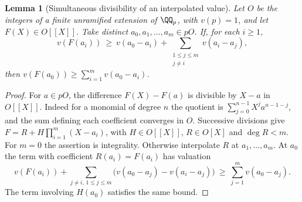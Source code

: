 \documentclass[a4paper,11pt]{article}
\newtheorem{lemma}[proposition]{Lemma}
\theoremstyle{definition}
\theoremstyle{remark}
\numberwithin{equation}{section}
\begin{document}
\begin{lemma}[Simultaneous divisibility of an interpolated value]
\label{lem:samples230}
Let \(O\) be the integers of a finite unramified extension of
\(\QQ_p\), with \(v(p)=1\), and let \(F(X)\in O[[X]]\).
Take distinct \(a_0,a_1,\ldots,a_m\in pO\). If, for each \(i\ge1\),
\[
 v(F(a_i))\ \ge\ v(a_0-a_i)+
                 \sum_{\substack{1\le j\le m\\j\ne i}}v(a_i-a_j),
\]
then \(v(F(a_0))\ge\sum_{i=1}^m v(a_0-a_i)\).
\end{lemma}
\begin{proof}
For \(a\in pO\), the difference \(F(X)-F(a)\) is divisible
by \(X-a\) in \(O[[X]]\). Indeed for a monomial of degree \(n\)
the quotient is \(\sum_{j=0}^{n-1}X^ja^{n-1-j}\), and the
sum defining each coefficient converges in \(O\). Successive
divisions give \(F=R+H\prod_{i=1}^m(X-a_i)\), with
\(H\in O[[X]]\), \(R\in O[X]\) and \(\deg R<m\).
For \(m=0\) the assertion is integrality. Otherwise
interpolate \(R\) at \(a_1,\ldots,a_m\). At \(a_0\) the term
with coefficient \(R(a_i)=F(a_i)\) has valuation
\[
 v(F(a_i))+
  \sum_{j\ne i,\,1\le j\le m}
       \bigl(v(a_0-a_j)-v(a_i-a_j)\bigr)
 \ \ge\ \sum_{j=1}^m v(a_0-a_j).
\]
The term involving \(H(a_0)\) satisfies the same bound.
\end{proof}
\end{document}
